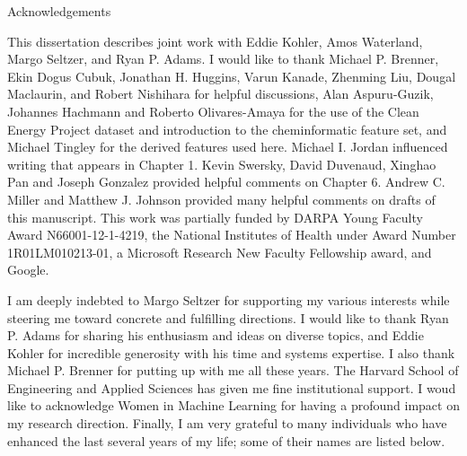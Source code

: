\newpage

\begin{spacing}{2}

\begin{center}
Acknowledgements \\
\end{center}

This dissertation describes joint work with 
Eddie Kohler, Amos Waterland, Margo Seltzer, and Ryan P. Adams.
I would like to thank Michael P. Brenner, Ekin Dogus Cubuk, Jonathan H. Huggins, Varun Kanade, Zhenming Liu, Dougal Maclaurin, and Robert Nishihara for helpful discussions, Alan Aspuru-Guzik, Johannes Hachmann and Roberto Olivares-Amaya for the use of the Clean Energy Project dataset and introduction to the cheminformatic feature set, and Michael Tingley for the derived features used here. 
Michael I. Jordan influenced writing that appears in Chapter 1.
Kevin Swersky, David Duvenaud, Xinghao Pan and Joseph Gonzalez provided helpful comments on Chapter 6.
Andrew C. Miller and Matthew J. Johnson provided many helpful comments on drafts of this manuscript. This work was partially funded by DARPA Young Faculty Award {N66001-12-1-4219}, the National Institutes of Health under Award Number {1R01LM010213-01}, a Microsoft Research New Faculty Fellowship award, and Google.

I am deeply indebted to Margo Seltzer for supporting my various interests while steering me toward concrete and fulfilling directions.
I would like to thank Ryan P. Adams for sharing his enthusiasm and ideas on diverse topics, and Eddie Kohler for incredible generosity with his time and systems expertise.
I also thank Michael P. Brenner for putting up with me all these years.
The Harvard School of Engineering and Applied Sciences has given me fine institutional support.
I woud like to acknowledge Women in Machine Learning for having a profound impact on my research direction. 
Finally, I am very grateful to many individuals who have enhanced the last several years of my life; some of their names are listed below. 

\newpage


\end{spacing}
